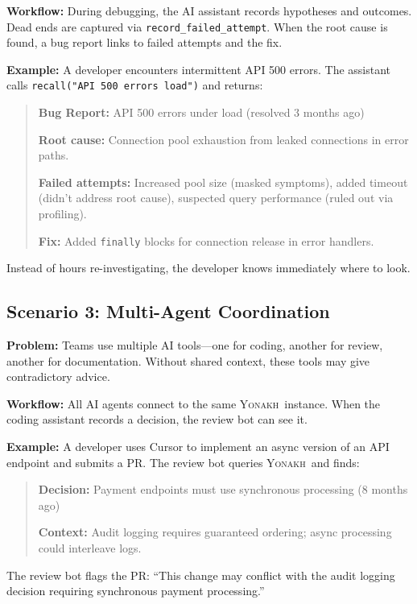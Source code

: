 \documentclass[10pt,journal,compsoc]{IEEEtran}
\newcommand{\yonakh}{\textsc{Yonakh}}
\begin{document}
\textbf{Workflow:} During debugging, the AI assistant records hypotheses and outcomes. Dead ends are captured via \texttt{record\_failed\_attempt}. When the root cause is found, a bug report links to failed attempts and the fix.

\textbf{Example:} A developer encounters intermittent API 500 errors. The assistant calls \texttt{recall("API 500 errors load")} and returns:

\begin{quote}
\textbf{Bug Report:} API 500 errors under load (resolved 3 months ago)

\textbf{Root cause:} Connection pool exhaustion from leaked connections in error paths.

\textbf{Failed attempts:} Increased pool size (masked symptoms), added timeout (didn't address root cause), suspected query performance (ruled out via profiling).

\textbf{Fix:} Added \texttt{finally} blocks for connection release in error handlers.
\end{quote}

Instead of hours re-investigating, the developer knows immediately where to look.

\subsection{Scenario 3: Multi-Agent Coordination}

\textbf{Problem:} Teams use multiple AI tools---one for coding, another for review, another for documentation. Without shared context, these tools may give contradictory advice.

\textbf{Workflow:} All AI agents connect to the same \yonakh\ instance. When the coding assistant records a decision, the review bot can see it.

\textbf{Example:} A developer uses Cursor to implement an async version of an API endpoint and submits a PR. The review bot queries \yonakh\ and finds:

\begin{quote}
\textbf{Decision:} Payment endpoints must use synchronous processing (8 months ago)

\textbf{Context:} Audit logging requires guaranteed ordering; async processing could interleave logs.
\end{quote}

The review bot flags the PR: ``This change may conflict with the audit logging decision requiring synchronous payment processing.''
\end{document}
